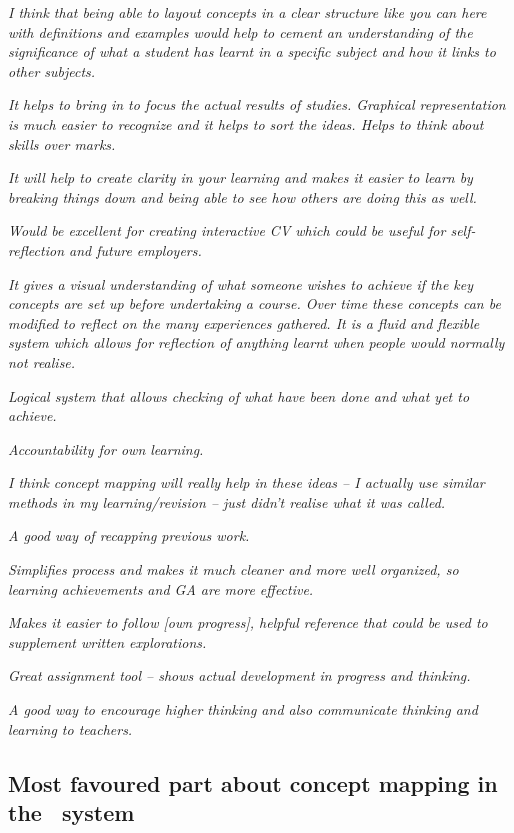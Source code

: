 \textit{I think that being able to layout concepts in a clear structure like
you can here with definitions and examples would help to cement an understanding
of the significance of what a student has learnt in a specific subject and how
it links to other subjects.}

\textit{It helps to bring in to focus the actual results of studies.
Graphical representation is much easier to recognize and it helps to sort the
ideas. Helps to think about skills over marks.}

\textit{It will help to create clarity in your learning and makes it easier
to learn by breaking things down and being able to see how others are doing this
as well.}

\textit{Would be excellent for creating interactive CV which could be useful
for self-reflection and future employers.}

\textit{It gives a visual understanding of what someone wishes to achieve if the
key concepts are set up before undertaking a course. Over time these concepts can be
modified to reflect on the many experiences gathered. It is a fluid and flexible
system which allows for reflection of anything learnt when people would normally
not realise.}

\textit{Logical system that allows checking of what have been done and what yet
to achieve.} 

\textit{Accountability for own learning.}

\textit{I think concept mapping will really help in these ideas -- I actually
use similar methods in my learning/revision -- just didn't realise what it was
called.}

\textit{A good way of recapping previous work.}

\textit{Simplifies process and makes it much cleaner and more well organized, so
learning achievements and GA are more effective.}

\textit{Makes it easier to follow [own progress], helpful reference that could
be used to supplement written explorations.}

\textit{Great assignment tool -- shows actual development in progress and
thinking.}

\textit{A good way to encourage higher thinking and also communicate thinking
and learning to teachers.}


\subsection[Most favoured part about concept mapping]{Most favoured part about
concept mapping in the \ep~system}

